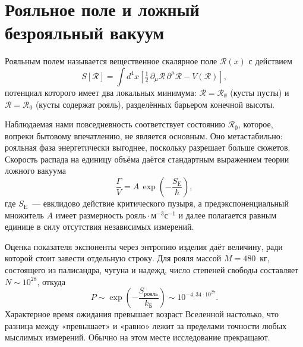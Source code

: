 \documentclass[11pt,a4paper]{article}
\newcommand{\Rfield}{\mathcal{R}}
\newcommand{\kB}{k_{\text{Б}}}
\begin{document}
\section{Рояльное поле и ложный безрояльный вакуум}

\begin{definition}
Рояльным полем называется вещественное скалярное поле $\Rfield(x)$ с действием
\[
S[\Rfield] = \int d^4x \left[ \tfrac{1}{2}\,\partial_\mu \Rfield\,\partial^\mu \Rfield - V(\Rfield) \right],
\]
потенциал которого имеет два локальных минимума: $\Rfield = \Rfield_\emptyset$ (кусты пусты) и $\Rfield = \Rfield_0$ (кусты содержат рояль), разделённых барьером конечной высоты.
\end{definition}

Наблюдаемая нами повседневность соответствует состоянию $\Rfield_\emptyset$, которое, вопреки бытовому впечатлению, не является основным. Оно метастабильно: рояльная фаза энергетически выгоднее, поскольку разрешает больше сюжетов. Скорость распада на единицу объёма даётся стандартным выражением теории ложного вакуума
\begin{equation}
\frac{\Gamma}{V} = A\,\exp\!\left(-\frac{S_{\mathrm{E}}}{\hbar}\right),
\label{eq:gamma}
\end{equation}
где $S_{\mathrm{E}}$~--- евклидово действие критического пузыря, а предэкспоненциальный множитель $A$ имеет размерность $\text{рояль}\cdot\text{м}^{-3}\text{с}^{-1}$ и далее полагается равным единице в силу отсутствия независимых измерений.

Оценка показателя экспоненты через энтропию изделия даёт величину, ради которой стоит завести отдельную строку. Для рояля массой $M = 480$~кг, состоящего из палисандра, чугуна и надежд, число степеней свободы составляет $N\sim10^{28}$, откуда
\begin{equation}
P \sim \exp\!\left(-\frac{S_{\text{рояль}}}{\kB}\right) \sim 10^{-4{,}34\cdot10^{27}}.
\label{eq:naive}
\end{equation}
Характерное время ожидания превышает возраст Вселенной настолько, что разница между «превышает» и «равно» лежит за пределами точности любых мыслимых измерений. Обычно на этом месте исследование прекращают.
\end{document}
